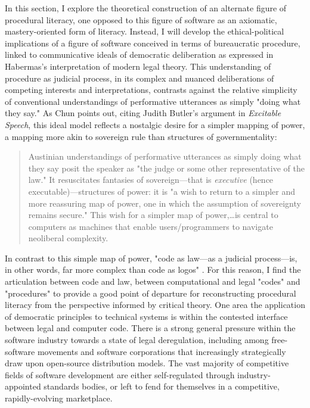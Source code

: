 In this section, I explore the theoretical construction of an alternate figure of procedural literacy, one opposed to this figure of software as an axiomatic, mastery-oriented form of literacy. Instead, I will develop the ethical-political implications of a figure of software conceived in terms of bureaucratic procedure, linked to communicative ideals of democratic deliberation  as expressed in Habermas's interpretation of modern legal theory. This understanding of procedure as judicial process, in its complex and nuanced deliberations of competing interests and interpretations, contrasts against the relative simplicity of conventional understandings of performative utterances as simply "doing what they say." As Chun points out, citing Judith Butler's argument in \emph{Excitable Speech}, this ideal model reflects a nostalgic desire for a simpler mapping of power, a mapping more akin to sovereign rule than structures of governmentality:
\blockcquote[28]{Chun2011}{
  Austinian understandings of performative utterances as simply doing what they say posit the speaker as "the judge or some other representative of the law." It resuscitates fantasies of sovereign---that is \emph{executive} (hence executable)---structures of power: it is "a wish to return to a simpler and more reassuring map of power, one in which the assumption of sovereignty remains secure." This wish for a simpler map of power,…is central to computers as machines that enable users/programmers to navigate neoliberal complexity. 
}
In contrast to this simple map of power, "code as law---as a judicial process---is, in other words, far more complex than code as logos" \autocite[28]{Chun2011}. For this reason, I find the articulation between code and law, between computational and legal "codes" and "procedures" to provide a good point of departure for reconstructing procedural literacy from the perspective informed by critical theory. One area the application of democratic principles to technical systems is within the contested interface between legal and computer code. There is a strong general pressure within the software industry towards a state of legal deregulation, including among free-software movements and software corporations that increasingly strategically draw upon open-source distribution models. The vast majority of competitive fields of software development are either self-regulated through industry-appointed standards bodies, or left to fend for themselves in a competitive, rapidly-evolving marketplace.

